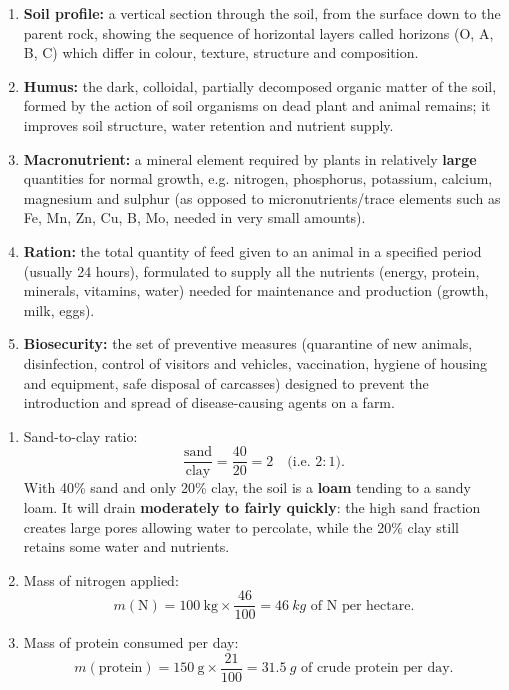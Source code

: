 \documentclass[11pt]{article}
\newcommand{\cle}[1]{{\popxbold\color{popdark}#1}}
\begin{document}
\begin{corrige}
\begin{enumerate}
\item \textbf{Soil profile:} a vertical section through the soil, from the surface down to the parent rock, showing the sequence of horizontal layers called \cle{horizons} (O, A, B, C) which differ in colour, texture, structure and composition.
\item \textbf{Humus:} the dark, colloidal, partially decomposed organic matter of the soil, formed by the action of soil organisms on dead plant and animal remains; it improves soil structure, water retention and nutrient supply.
\item \textbf{Macronutrient:} a mineral element required by plants in relatively \textbf{large} quantities for normal growth, e.g. nitrogen, phosphorus, potassium, calcium, magnesium and sulphur (as opposed to micronutrients/trace elements such as Fe, Mn, Zn, Cu, B, Mo, needed in very small amounts).
\item \textbf{Ration:} the total quantity of feed given to an animal in a specified period (usually 24 hours), formulated to supply all the nutrients (energy, protein, minerals, vitamins, water) needed for maintenance and production (growth, milk, eggs).
\item \textbf{Biosecurity:} the set of preventive measures (quarantine of new animals, disinfection, control of visitors and vehicles, vaccination, hygiene of housing and equipment, safe disposal of carcasses) designed to prevent the introduction and spread of disease-causing agents on a farm.
\end{enumerate}
\end{corrige}

\begin{corrige}
\begin{enumerate}
\item Sand-to-clay ratio:
\[ \frac{\text{sand}}{\text{clay}} = \frac{40}{20} = 2 \quad \text{(i.e. } 2:1\text{)}. \]
With 40\% sand and only 20\% clay, the soil is a \textbf{loam} tending to a sandy loam. It will drain \textbf{moderately to fairly quickly}: the high sand fraction creates large pores allowing water to percolate, while the 20\% clay still retains some water and nutrients.
\item Mass of nitrogen applied:
\[ m(\mathrm{N}) = 100\ \mathrm{kg} \times \frac{46}{100} = \SI{46}{kg} \text{ of N per hectare}. \]
\item Mass of protein consumed per day:
\[ m(\text{protein}) = 150\ \mathrm{g} \times \frac{21}{100} = \SI{31.5}{g} \text{ of crude protein per day}. \]
\end{enumerate}
\end{corrige}
\end{document}
